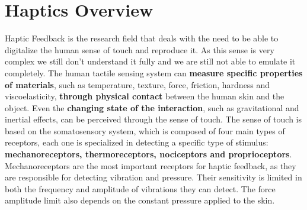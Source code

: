 \section{Haptics Overview}
Haptic Feedback is the research field that deals with the need to be able to digitalize the human sense of touch and reproduce it.
As this sense is very complex we still don’t understand it fully and we are still not able to emulate it completely. 
The human tactile sensing system can \textbf{measure specific properties of materials}, such as temperature, texture, force, friction, hardness and viscoelasticity, \textbf{through physical contact} between the human skin and the object.
Even the \textbf{changing state of the interaction}, such as gravitational and inertial effects, can be perceived through the sense of touch.
The sense of touch is based on the somatosensory system, which is composed of four main types of receptors, each one is specialized in detecting a specific type of stimulus: \textbf{mechanoreceptors, thermoreceptors, nociceptors and proprioceptors}.
Mechanoreceptors are the most important receptors for haptic feedback, as they are responsible for detecting vibration and pressure.
Their sensitivity is limited in both the frequency and amplitude of vibrations they can detect. The force amplitude limit also depends on the constant pressure applied to the skin.